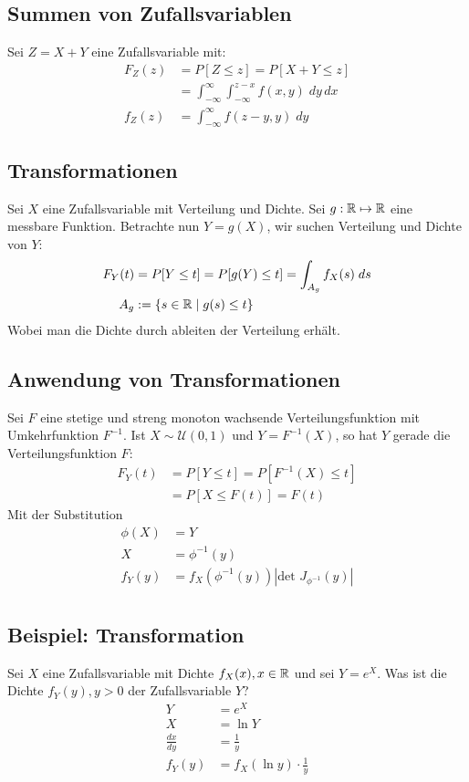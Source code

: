 \subsection{Summen von Zufallsvariablen}
Sei $Z = X + Y$ eine Zufallsvariable mit:
\begin{align*}
  F_Z (z) & = P[Z \leq z] = P[X + Y \leq z]                                     \\
          & = \int_{-\infty}^\infty \int_{-\infty}^{z - x} f (x, y )\; dy \, dx \\
  f_Z (z) & = \int_{-\infty}^\infty f (z - y, y) \; dy
\end{align*}
\subsection{Transformationen}
Sei $X$ eine Zufallsvariable mit Verteilung und Dichte. Sei $g: \mathbb{R} \mapsto \mathbb{R}$
eine messbare Funktion. Betrachte nun $Y = g (X)$, wir suchen Verteilung und
Dichte von $Y$:
\begin{align*}
  F_Y (t) & = P[Y \leq t] = P[g (Y) \leq t] = \int_{A_g} f_X (s) \; ds \\
  A_g     & := \{s \in \mathbb{R} \; | \; g (s) \leq t\}
\end{align*}
Wobei man die Dichte durch ableiten der Verteilung erhält.
\subsection{Anwendung von Transformationen}
Sei $F$ eine stetige und streng monoton wachsende Verteilungsfunktion mit
Umkehrfunktion $F^{-1}$. Ist $X \sim \mathcal{U} (0, 1)$ und $Y = F^{-1} (X)$,
so hat $Y$ gerade die Verteilungsfunktion $F$:
\begin{align*}
  F_Y (t) & = P[Y \leq t] = P[F^{-1} (X) \leq t] \\
          & = P[X \leq F (t)] = F (t)
\end{align*}
Mit der Substitution
\begin{align*}
  \phi(X) & = Y                                              \\
  X       & = \phi^{-1}(y)                                   \\
  f_Y(y)  & = f_X(\phi^{-1}(y))|\text{det }J_{\phi^{-1}}(y)| \\
\end{align*}
\BoxStart{}
\subsection{Beispiel: Transformation}
Sei $X$ eine Zufallsvariable mit Dichte $f_X(x), x \in \mathbb{R}$ und sei $Y = e^X$. Was ist die Dichte $f_Y(y), y > 0$ der Zufallsvariable $Y$?
\begin{align*}
  Y             & = e^X                          \\
  X             & = \ln Y                        \\
  \frac{dx}{dy} & = \frac{1}{y}                  \\
  f_Y(y)        & = f_X(\ln y) \cdot \frac{1}{y} \\
\end{align*}

\BoxEnd{}
